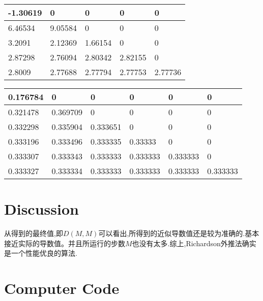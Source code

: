 \documentclass{article}
\begin{document}
	\bigskip
	
		
	
	\begin{table}[H]
		\begin{tabular}{|l|l|l|l|l|}
			\hline
			-1.30619 & 0       & 0       & 0       & 0       \\ \hline
			6.46534  & 9.05584 & 0       & 0       & 0       \\ \hline
			3.2091   & 2.12369 & 1.66154 & 0       & 0       \\ \hline
			2.87298  & 2.76094 & 2.80342 & 2.82155 & 0       \\ \hline
			2.8009   & 2.77688 & 2.77794 & 2.77753 & 2.77736 \\ \hline
		\end{tabular}
	\end{table}

	\begin{table}[H]
		\begin{tabular}{|l|l|l|l|l|l|}
			\hline
			0.176784 & 0        & 0        & 0        & 0        & 0        \\ \hline
			0.321478 & 0.369709 & 0        & 0        & 0        & 0        \\ \hline
			0.332298 & 0.335904 & 0.333651 & 0        & 0        & 0        \\ \hline
			0.333196 & 0.333496 & 0.333335 & 0.33333  & 0        & 0        \\ \hline
			0.333307 & 0.333343 & 0.333333 & 0.333333 & 0.333333 & 0        \\ \hline
			0.333327 & 0.333334 & 0.333333 & 0.333333 & 0.333333 & 0.333333 \\ \hline
		\end{tabular}
	\end{table}
	
	

	\section{Discussion}
	
	从得到的最终值,即$D(M,M)$可以看出,所得到的近似导数值还是较为准确的.基本接近实际的导数值。并且所运行的步数$M$也没有太多.综上,Richardson外推法确实是一个性能优良的算法.
	
	
	
	\section{Computer Code}
		
	

	

	
\end{document}
